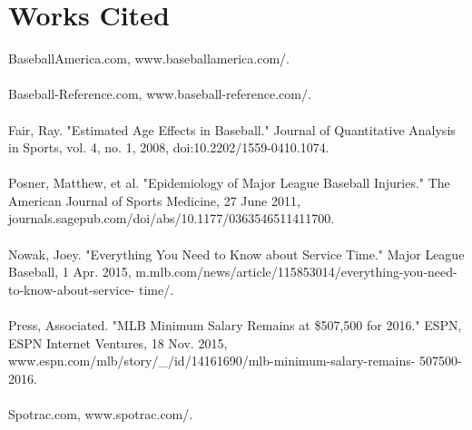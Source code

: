\documentclass[12pt]{article}
\newcommand\tab[1][1cm]{\hspace*{#1}}
\begin{document}
\section*{Works Cited}
BaseballAmerica.com, www.baseballamerica.com/. \\~\\
Baseball-Reference.com, www.baseball-reference.com/. \\~\\
Fair, Ray. "Estimated Age Effects in Baseball." Journal of Quantitative Analysis in Sports, vol. 4, \tab no. 1, 2008, doi:10.2202/1559-0410.1074.\\~\\%
Posner, Matthew, et al. "Epidemiology of Major League Baseball Injuries." The American Journal \tab of Sports Medicine, 27 June 2011, journals.sagepub.com/doi/abs/10.1177/0363546511411700. \\~\\
Nowak, Joey. "Everything You Need to Know about Service Time." Major League Baseball, 1 \tab Apr. 2015, m.mlb.com/news/article/115853014/everything-you-need-to-know-about-service- \tab time/. \\~\\
Press, Associated. "MLB Minimum Salary Remains at \$507,500 for 2016." ESPN, ESPN Internet \tab Ventures, 18 Nov. 2015, www.espn.com/mlb/story/\_/id/14161690/mlb-minimum-salary-remains- \tab 507500-2016.\\~\\
Spotrac.com, www.spotrac.com/.
\end{document}
